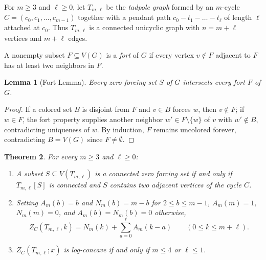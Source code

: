 \documentclass[11pt]{article}
\newtheorem{theorem}{Theorem}
\newtheorem{lemma}[theorem]{Lemma}
\begin{document}
For $m \ge 3$ and $\ell \ge 0$, let $T_{m,\ell}$ be the \emph{tadpole graph}
formed by an $m$-cycle $C = (c_0, c_1, \dots, c_{m-1})$ together with a pendant
path $c_0 - t_1 - \dots - t_\ell$ of length $\ell$ attached at $c_0$. Thus
$T_{m,\ell}$ is a connected unicyclic graph with $n = m + \ell$ vertices and
$m + \ell$ edges.

A nonempty subset $F \subseteq V(G)$ is a \emph{fort} of $G$ if every vertex
$v \notin F$ adjacent to $F$ has at least two neighbors in $F$.

\begin{lemma}[Fort Lemma]\label{lem:fort}
Every zero forcing set $S$ of $G$ intersects every fort $F$ of $G$.
\end{lemma}

\begin{proof}
If a colored set $B$ is disjoint from $F$ and $v \in B$ forces $w$, then
$v \notin F$; if $w \in F$, the fort property supplies another neighbor
$w' \in F \setminus \{w\}$ of $v$ with $w' \notin B$, contradicting uniqueness
of $w$. By induction, $F$ remains uncolored forever, contradicting $B = V(G)$
since $F \neq \emptyset$.
\end{proof}

\begin{theorem}\label{thm:tadpole}
For every $m \ge 3$ and $\ell \ge 0$:
\begin{enumerate}
  \item A subset $S \subseteq V(T_{m,\ell})$ is a connected zero forcing set if
        and only if $T_{m,\ell}[S]$ is connected and $S$ contains two adjacent
        vertices of the cycle $C$.
  \item Setting $A_m(b) = b$ and $N_m(b) = m - b$ for $2 \le b \le m - 1$,
        $A_m(m) = 1$, $N_m(m) = 0$, and $A_m(b) = N_m(b) = 0$ otherwise,
        \[
        Z_C(T_{m,\ell}, k) = N_m(k) + \sum_{a=0}^{\ell} A_m(k - a)
        \qquad (0 \le k \le m + \ell).
        \]
  \item $Z_C(T_{m,\ell}; x)$ is log-concave if and only if $m \le 4$ or
        $\ell \le 1$.
\end{enumerate}
\end{theorem}
\end{document}
